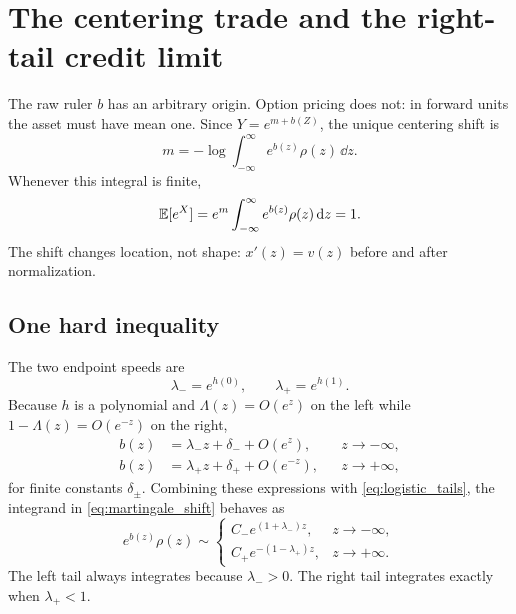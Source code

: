 \documentclass[11pt]{article}
\begin{document}
\section{The centering trade and the right-tail credit limit}
\label{sec:center}

The raw ruler $b$ has an arbitrary origin.  Option pricing does not: in forward
units the asset must have mean one.  Since $Y=e^{m+b(Z)}$, the unique centering
shift is
\begin{equation}
m=-\log\int_{-\infty}^{\infty}e^{b(z)}\rho(z)\,\dd z.
\label{eq:martingale_shift}
\end{equation}
Whenever this integral is finite,
\begin{equation}
\mathbb{E}[e^X]
=e^m\int_{-\infty}^{\infty}e^{b(z)}\rho(z)\,\mathrm{d} z=1.
\label{eq:martingale_check}
\end{equation}
The shift changes location, not shape: $x'(z)=v(z)$ before and after
normalization.

\subsection{One hard inequality}

The two endpoint speeds are
\begin{equation}
\lambda_-=e^{h(0)},\qquad \lambda_+=e^{h(1)}.
\label{eq:endpoint_speeds}
\end{equation}
Because $h$ is a polynomial and
$\Lambda(z)=O(e^z)$ on the left while $1-\Lambda(z)=O(e^{-z})$ on the right,
\begin{align}
b(z)&=\lambda_-z+\delta_-+O(e^z),
&&z\to-\infty, \label{eq:left_b_asymptotic}\\
b(z)&=\lambda_+z+\delta_++O(e^{-z}),
&&z\to+\infty, \label{eq:right_b_asymptotic}
\end{align}
for finite constants $\delta_\pm$.  Combining these expressions with
\eqref{eq:logistic_tails}, the integrand in \eqref{eq:martingale_shift} behaves
as
\begin{equation}
e^{b(z)}\rho(z)\sim
\begin{cases}
C_-e^{(1+\lambda_-)z},&z\to-\infty,\\
C_+e^{-(1-\lambda_+)z},&z\to+\infty.
\end{cases}
\label{eq:normalizer_tails}
\end{equation}
The left tail always integrates because $\lambda_->0$.  The right tail
integrates exactly when $\lambda_+<1$.
\end{document}
